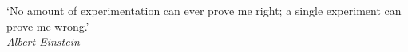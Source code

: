 
\clearpage

\narrowlinespacing

\vspace*{4mm}

`No amount of experimentation can ever prove me right; a single experiment can prove me wrong.'\\
\emph{Albert Einstein}

\normallinespacing
